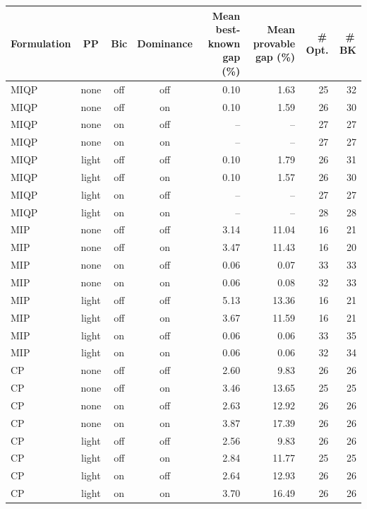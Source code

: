 \documentclass[11pt]{article}
\begin{document}
\begin{table}[t]
\centering
\scriptsize
\setlength{\tabcolsep}{5pt}
\begin{tabular}{@{}lccc rrrr@{}}
\hline
Formulation & PP & Bic & Dominance & \makecell{Mean best-known\\gap (\%)} & \makecell{Mean provable\\gap (\%)} & \#\,Opt. & \#\,BK \\
\hline
MIQP & none  & off & off & 0.10 & 1.63 & 25 & 32 \\
MIQP & none  & off & on  & 0.10 & 1.59 & 26 & 30 \\
MIQP & none  & on  & off & --   & --   & 27 & 27 \\
MIQP & none  & on  & on  & --   & --   & 27 & 27 \\
MIQP & light & off & off & 0.10 & 1.79 & 26 & 31 \\
MIQP & light & off & on  & 0.10 & 1.57 & 26 & 30 \\
MIQP & light & on  & off & --   & --   & 27 & 27 \\
MIQP & light & on  & on  & --   & --   & 28 & 28 \\
\hline
MIP & none  & off & off & 3.14 & 11.04 & 16 & 21 \\
MIP & none  & off & on  & 3.47 & 11.43 & 16 & 20 \\
MIP & none  & on  & off & 0.06 & 0.07  & 33 & 33 \\
MIP & none  & on  & on  & 0.06 & 0.08  & 32 & 33 \\
MIP & light & off & off & 5.13 & 13.36 & 16 & 21 \\
MIP & light & off & on  & 3.67 & 11.59 & 16 & 21 \\
MIP & light & on  & off & 0.06 & 0.06  & 33 & 35 \\
MIP & light & on  & on  & 0.06 & 0.06  & 32 & 34 \\
\hline
CP & none  & off & off & 2.60 & 9.83  & 26 & 26 \\
CP & none  & off & on  & 3.46 & 13.65 & 25 & 25 \\
CP & none  & on  & off & 2.63 & 12.92 & 26 & 26 \\
CP & none  & on  & on  & 3.87 & 17.39 & 26 & 26 \\
CP & light & off & off & 2.56 & 9.83  & 26 & 26 \\
CP & light & off & on  & 2.84 & 11.77 & 25 & 25 \\
CP & light & on  & off & 2.64 & 12.93 & 26 & 26 \\
CP & light & on  & on  & 3.70 & 16.49 & 26 & 26 \\

\end{tabular}
\end{table}
\end{document}
